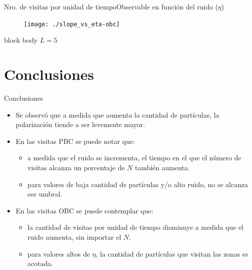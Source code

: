 \documentclass{beamer}
\begin{document}
            \begin{frame}{Nro. de visitas por unidad de tiempo}{Observable en función del ruido ($\eta$)}
                \begin{figure}[H!]
                    \texttt{[image: ./slope\_vs\_eta-obc]}
                    \label{fig:obc_3}
                \end{figure}
                \begin{beamercolorbox}[sep=5pt,center]{block body}
                    \small{$L=5$}
                \end{beamercolorbox}
            \end{frame}

    \section{Conclusiones}

        \begin{frame}{Conclusiones}
            \begin{itemize}
                \item Se observó que a medida que aumenta la cantidad de partículas, la polarización tiende a ser
                levemente mayor.
                \item En las visitas PBC se puede notar que:
                \begin{itemize}
                    \item a medida que el ruido se incrementa, el tiempo en el que el número de visitas alcanza un
                    porcentaje de $N$ también aumenta.
                    \item para valores de baja cantidad de partículas y/o alto ruido, no se alcanza ese umbral.
                \end{itemize}
                \item En las visitas OBC se puede contemplar que:
                \begin{itemize}
                    \item la cantidad de visitas por unidad de tiempo disminuye a medida que el ruido aumenta, sin importar el $N$.
                    \item para valores altos de $\eta$, la cantidad de partículas que visitan las zonas es acotada.
                \end{itemize}
            \end{itemize}
        \end{frame}
\end{document}
